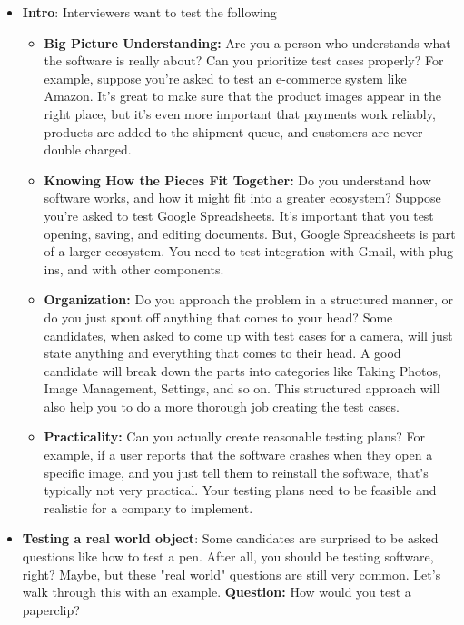 \documentclass{report}
\begin{document}
    \pagebreak 
    \begin{itemize}
        \item \textbf{Intro}: Interviewers want to test the following
            \begin{itemize}
                \item \textbf{Big Picture Understanding:} Are you a person who understands what the software is really about? Can you prioritize test cases properly? For example, suppose you're asked to test an e-commerce system like Amazon. It's great to make sure that the product images appear in the right place, but it's even more important that payments work reliably, products are added to the shipment queue, and customers are never double charged.
                \item \textbf{Knowing How the Pieces Fit Together:} Do you understand how software works, and how it might fit into a greater ecosystem? Suppose you're asked to test Google Spreadsheets. It's important that you test opening, saving, and editing documents. But, Google Spreadsheets is part of a larger ecosystem. You need to test integration with Gmail, with plug-ins, and with other components.
                \item \textbf{Organization:} Do you approach the problem in a structured manner, or do you just spout off anything that comes to your head? Some candidates, when asked to come up with test cases for a camera, will just state anything and everything that comes to their head. A good candidate will break down the parts into categories like Taking Photos, Image Management, Settings, and so on. This structured approach will also help you to do a more thorough job creating the test cases.
                \item \textbf{Practicality:} Can you actually create reasonable testing plans? For example, if a user reports that the software crashes when they open a specific image, and you just tell them to reinstall the software, that's typically not very practical. Your testing plans need to be feasible and realistic for a company to implement.
            \end{itemize}
        \item \textbf{Testing a real world object}: Some candidates are surprised to be asked questions like how to test a pen. After all, you should be testing software, right? Maybe, but these "real world" questions are still very common. Let's walk through this with an example.
            \bigbreak \noindent 
            \textbf{Question:} How would you test a paperclip?

\end{itemize}
\end{document}
